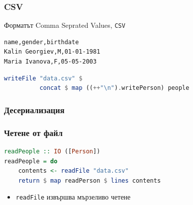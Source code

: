 \documentclass{beamer}
\begin{document}
\begin{frame}[fragile]
  \frametitle{CSV}

Форматът Comma Seprated Values, \verb#CSV#

\begin{verbatim}
name,gender,birthdate
Kalin Georgiev,M,01-01-1981
Maria Ivanova,F,05-05-2003
\end{verbatim}

\begin{lstlisting}[basicstyle=\small,language=Haskell]
writeFile "data.csv" $ 
          concat $ map ((++"\n").writePerson) people
\end{lstlisting}


\end{frame}


\begin{frame}[fragile]
  \frametitle{Десериализация}
\end{frame}


\begin{frame}[fragile]
  \frametitle{Четене от файл}


\begin{lstlisting}[basicstyle=\small,language=Haskell]
readPeople :: IO ([Person])
readPeople = do
    contents <- readFile "data.csv"
    return $ map readPerson $ lines contents  
\end{lstlisting}

\bigskip

\begin{itemize}
  \item \verb#readFile# извършва мързеливо четене
\end{itemize}


\end{frame}


\end{document}

